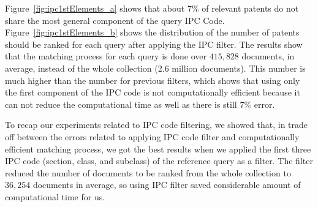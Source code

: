 Figure~\ref{fig:ipc1stElements_a} shows that about 7\% of relevant patents do not share the most general component of the query IPC Code. 
Figure~\ref{fig:ipc1stElements_b} shows the distribution of the number of patents should be ranked for each query after applying the IPC filter.
The results show that the matching process for each query is done over $ 415,828 $ documents, in average, instead of the whole collection (2.6 million documents). This number is much higher than the number for previous filters, which shows that using only the first component of the IPC code is not computationally efficient because it can not reduce the computational time as well as there is still 7\% error. 

To recap our experiments related to IPC code filtering, we showed that, in trade off between the errors related to applying IPC code filter and computationally efficient matching process, we got the best results when we applied the first three IPC code (section, class, and subclass) of the reference query as a filter. The filter reduced the number of documents to be ranked from the whole collection to $ 36,254 $ documents in average, so using IPC filter saved considerable amount of computational time for us.

